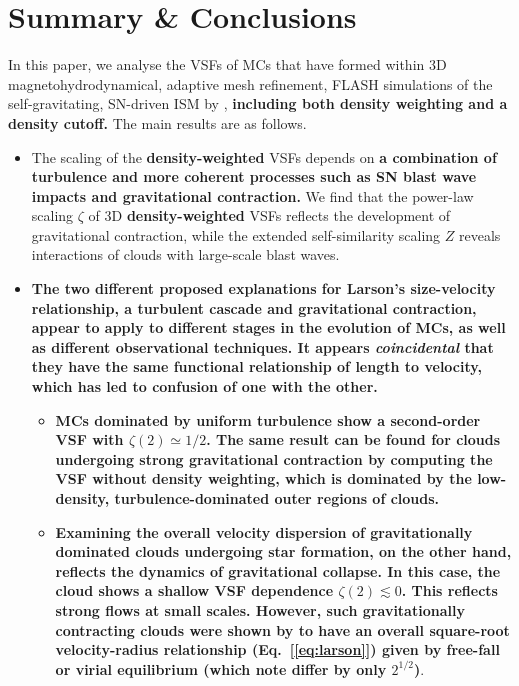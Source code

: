 \section{Summary \& Conclusions}\label{conclusions}

In this paper, we analyse the VSFs of MCs that have formed within 3D magnetohydrodynamical, adaptive mesh refinement, FLASH simulations of the self-gravitating, SN-driven ISM by , \textbf{including both density weighting and a density cutoff.}
The main results are as follows.

\begin{itemize}
	\item The scaling of the \textbf{density-weighted} VSFs depends on 
      \textbf{a combination of turbulence and more coherent processes such as 
       SN blast wave impacts and gravitational contraction.}
We find that the power-law scaling $\zeta$ of 3D \textbf{density-weighted} VSFs reflects the development of gravitational contraction, while the extended self-similarity scaling $Z$ reveals interactions of clouds with large-scale %
blast waves.
        \item \textbf{The two different proposed explanations for Larson's size-velocity relationship, a turbulent cascade and gravitational contraction,  appear to apply to different stages in the evolution of MCs, as well as different observational techniques. It appears {\em coincidental} that they have the same functional relationship of length to velocity, which has led to confusion of one with the other.  }
\begin{itemize}
 \item \textbf{MCs dominated by uniform turbulence show a second-order VSF with $\zeta(2) \simeq 1/2$.  The same result can be found for clouds undergoing strong gravitational contraction by computing the VSF without density weighting, which is dominated by the low-density, turbulence-dominated outer regions of clouds.}
\item \textbf{Examining the overall velocity dispersion of gravitationally dominated clouds undergoing star formation, on the other hand, reflects the dynamics of gravitational collapse.  In this case, the cloud shows a shallow VSF dependence $\zeta(2) \lesssim 0$. This reflects strong flows at small scales. However, such gravitationally contracting clouds were shown by  to have an overall square-root velocity-radius relationship (Eq.~[\ref{eq:larson}]) given by free-fall or virial equilibrium (which \citealt{Ballesteros2011} note differ by only $2^{1/2}$)}.

\end{itemize}
\end{itemize}
